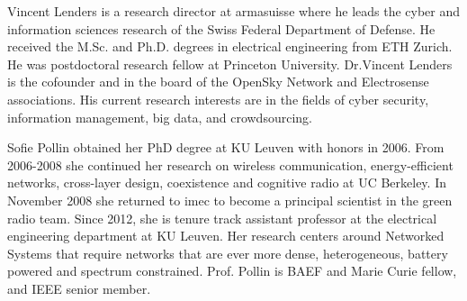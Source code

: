 \begin{IEEEbiography}
    {Vincent Lenders}
is a research director at armasuisse where he leads the cyber and information sciences research of the Swiss Federal Department of Defense. He received the M.Sc. and Ph.D. degrees in electrical engineering from ETH Zurich. He was postdoctoral research fellow at Princeton University. Dr.Vincent Lenders is the cofounder and in the board of the OpenSky Network and Electrosense associations. His current research interests are in the fields of cyber security, information management, big data, and crowdsourcing.
\end{IEEEbiography}

\begin{IEEEbiography}
    {Sofie Pollin}
obtained her PhD degree at KU Leuven with honors in 2006. From 2006-2008 she continued her research on wireless communication, energy-efficient networks, cross-layer design, coexistence and cognitive radio at UC Berkeley.  In November 2008 she returned to imec to become a principal scientist in the green radio team. Since 2012, she is tenure track assistant professor at the electrical engineering department at KU Leuven. Her research centers around Networked Systems that require networks that are ever more dense, heterogeneous, battery powered and spectrum constrained. Prof. Pollin is BAEF and Marie Curie fellow, and IEEE senior member. 
\end{IEEEbiography}